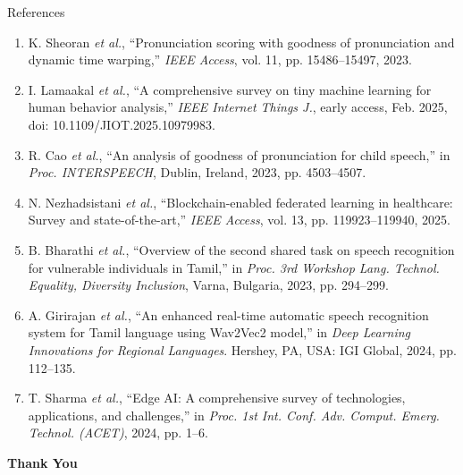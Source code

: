 \documentclass[aspectratio=169, 11pt, xcolor=table]{beamer}
\begin{document}
\begin{frame}[allowframebreaks]{References}
    \tiny
    \begin{enumerate}
        \item K. Sheoran \textit{et al.}, ``Pronunciation scoring with goodness of pronunciation and dynamic time warping,'' \textit{IEEE Access}, vol. 11, pp. 15486--15497, 2023.
        
        \item I. Lamaakal \textit{et al.}, ``A comprehensive survey on tiny machine learning for human behavior analysis,'' \textit{IEEE Internet Things J.}, early access, Feb. 2025, doi: 10.1109/JIOT.2025.10979983.
        
        \item R. Cao \textit{et al.}, ``An analysis of goodness of pronunciation for child speech,'' in \textit{Proc. INTERSPEECH}, Dublin, Ireland, 2023, pp. 4503--4507.
        
        \item N. Nezhadsistani \textit{et al.}, ``Blockchain-enabled federated learning in healthcare: Survey and state-of-the-art,'' \textit{IEEE Access}, vol. 13, pp. 119923--119940, 2025.
        
        \item B. Bharathi \textit{et al.}, ``Overview of the second shared task on speech recognition for vulnerable individuals in Tamil,'' in \textit{Proc. 3rd Workshop Lang. Technol. Equality, Diversity Inclusion}, Varna, Bulgaria, 2023, pp. 294--299.
        
        \item A. Girirajan \textit{et al.}, ``An enhanced real-time automatic speech recognition system for Tamil language using Wav2Vec2 model,'' in \textit{Deep Learning Innovations for Regional Languages}. Hershey, PA, USA: IGI Global, 2024, pp. 112--135.
        
        \item T. Sharma \textit{et al.}, ``Edge AI: A comprehensive survey of technologies, applications, and challenges,'' in \textit{Proc. 1st Int. Conf. Adv. Comput. Emerg. Technol. (ACET)}, 2024, pp. 1--6.
    \end{enumerate}
\end{frame}
\begin{frame}
    \centering
    {\Huge \textbf{\textcolor{amritaMaroon}{Thank You}}}
\end{frame}
\end{document}
